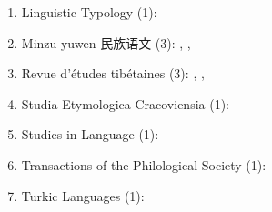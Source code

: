 \documentclass[oldfontcommands,oneside,a4paper,11pt]{article}
\newcommand{\zh}[1]{{\cn #1}}
\begin{document}
\begin{enumerate}
 \item Linguistic Typology (1): \citet{jacques13harmonization}
 \item Minzu yuwen \zh{民族语文} (3): \citet{jacques03s.houzhui}, \citet{jacques04redupl}, \citet{jacques08weiyu}
 \item Revue d'études tibétaines (3): \citet{jacques07naksatram},  \citet{jacques08debther},   \citet{jacques10ndr}
 \item Studia Etymologica Cracoviensia (1):  \citet{jacques13vama}
  \item Studies in Language (1): \citet{jacques14auditory}
  \item Transactions of the Philological Society (1):  \citet{jacques12internal}
  \item Turkic Languages (1): \citet{antonov12kumush}
 \end{enumerate} 
 
\end{document}
